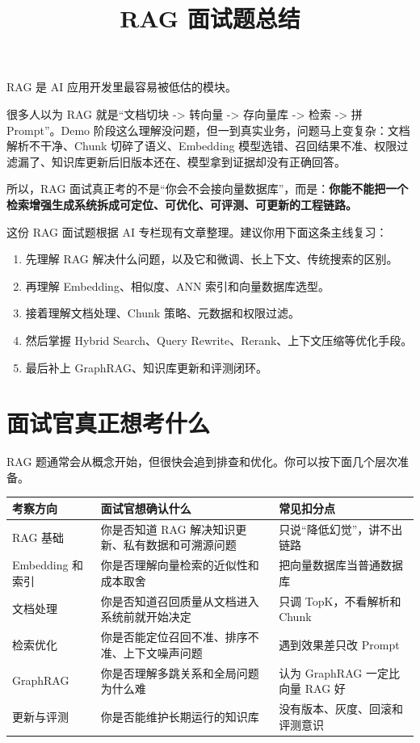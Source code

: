 \documentclass[10pt,a4paper]{ctexart}
\begin{document}
\title{RAG 面试题总结}
\date{}
\maketitle

RAG 是 AI 应用开发里最容易被低估的模块。



很多人以为 RAG 就是“文档切块 -> 转向量 -> 存向量库 -> 检索 -> 拼 Prompt”。Demo 阶段这么理解没问题，但一到真实业务，问题马上变复杂：文档解析不干净、Chunk 切碎了语义、Embedding 模型选错、召回结果不准、权限过滤漏了、知识库更新后旧版本还在、模型拿到证据却没有正确回答。



所以，RAG 面试真正考的不是“你会不会接向量数据库”，而是：\textbf{你能不能把一个检索增强生成系统拆成可定位、可优化、可评测、可更新的工程链路。}



这份 RAG 面试题根据 AI 专栏现有文章整理。建议你用下面这条主线复习：


\begin{enumerate}[itemsep=2pt, topsep=4pt]
  \item 先理解 RAG 解决什么问题，以及它和微调、长上下文、传统搜索的区别。
  \item 再理解 Embedding、相似度、ANN 索引和向量数据库选型。
  \item 接着理解文档处理、Chunk 策略、元数据和权限过滤。
  \item 然后掌握 Hybrid Search、Query Rewrite、Rerank、上下文压缩等优化手段。
  \item 最后补上 GraphRAG、知识库更新和评测闭环。
\end{enumerate}


\section{面试官真正想考什么}


RAG 题通常会从概念开始，但很快会追到排查和优化。你可以按下面几个层次准备。


{\footnotesize
\begin{tabularx}{\textwidth}{|X|X|X|}
\hline
\textbf{考察方向} & \textbf{面试官想确认什么} & \textbf{常见扣分点} \\
\hline
RAG 基础 & 你是否知道 RAG 解决知识更新、私有数据和可溯源问题 & 只说“降低幻觉”，讲不出链路 \\
\hline
Embedding 和索引 & 你是否理解向量检索的近似性和成本取舍 & 把向量数据库当普通数据库 \\
\hline
文档处理 & 你是否知道召回质量从文档进入系统前就开始决定 & 只调 TopK，不看解析和 Chunk \\
\hline
检索优化 & 你是否能定位召回不准、排序不准、上下文噪声问题 & 遇到效果差只改 Prompt \\
\hline
GraphRAG & 你是否理解多跳关系和全局问题为什么难 & 认为 GraphRAG 一定比向量 RAG 好 \\
\hline
更新与评测 & 你是否能维护长期运行的知识库 & 没有版本、灰度、回滚和评测意识 \\
\hline
\end{tabularx}
}
\end{document}
